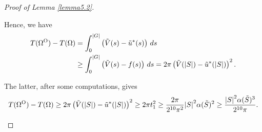 \documentclass[10pt,a4paper]{amsart}
\newcommand{\OO}{\text{\normalfont  O}}
\newcommand{\abs}[1]{{\left|#1\right|}}
\begin{document}
\begin{proof}[Proof of Lemma \ref{lemma5.2}]
\begin{itemize}
         Hence, we have 
         \begin{equation}
             \label{claimbho}
             \begin{aligned}
                 T(\Omega^\OO)-T(\Omega)&=\int _0^{\abs{G}} \left(\tilde V(s)-\tilde u^\ast(s)\right)\, ds \\
                 &\geq \int _0^{\abs{G}} \left(\tilde V(s)-f(s)\right)\, ds= 2 \pi \left(\tilde V(\abs{S})-\tilde u^\ast(\abs{S})\right)^2.
             \end{aligned}
             \end{equation} 

             The latter, after some computations,  gives
              \begin{equation*}
             T(\Omega^\OO)-T(\Omega)\geq 2 \pi \left(\tilde V(\abs{S})-\tilde u^\ast(\abs{S})\right)^2\geq 2 \pi t_1^2\geq \frac{2 \pi}{2^{10} \pi^2}\abs{S}^2\alpha(\tilde{S})^2\geq \frac{\abs{S}^2\alpha(\tilde{S})^3}{2^{10} \pi}.
         \end{equation*}
         
         
    \end{itemize}
      \begin{figure}[ht!]
        \centering
        



\begin{tikzpicture}[x=0.75pt,y=0.75pt,yscale=-1,xscale=1]


\end{tikzpicture}
\end{figure}
\end{proof}
\end{document}
